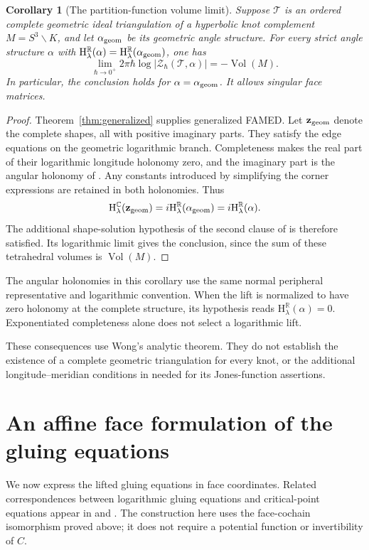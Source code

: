 \documentclass[11pt]{article}
\newtheorem{corollary}[theorem]{Corollary}
\theoremstyle{definition}\newtheorem{definition}[theorem]{Definition}
\theoremstyle{remark}\newtheorem{remark}[theorem]{Remark}
\newcommand{\R}{\mathbb R}
\begin{document}
\begin{corollary}[The partition-function volume limit]\label{cor:volumelimit}
Suppose $\mathcal T$ is an ordered complete geometric ideal
triangulation of a hyperbolic knot complement $M=S^3\smallsetminus K$,
and let $\alpha_{\rm geom}$ be its geometric angle structure.
For every strict angle structure $\alpha$ with
$\mathrm H_\lambda^{\R}(\alpha)=
\mathrm H_\lambda^{\R}(\alpha_{\rm geom})$, one has
\[
\lim_{\hbar\to0^+}2\pi\hbar
\log|\mathscr Z_\hbar(\mathcal T,\alpha)|=-\operatorname{Vol}(M).
\]
In particular, the conclusion holds for $\alpha=\alpha_{\rm geom}$.
It allows singular face matrices.
\end{corollary}
\begin{proof}
Theorem~\ref{thm:generalized} supplies generalized FAMED. Let
$\mathbf z_{\rm geom}$ denote the complete shapes, all with positive
imaginary parts. They satisfy the edge equations on the geometric
logarithmic branch. Completeness makes the real part of their
logarithmic longitude holonomy zero, and the imaginary part is the
angular holonomy of \cite[Section~2.2]{Wong}. Any constants introduced
by simplifying the corner expressions are retained in both holonomies. Thus
\[
\mathrm H_\lambda^{\mathbb C}(\mathbf z_{\rm geom})
=i\mathrm H_\lambda^{\R}(\alpha_{\rm geom})
=i\mathrm H_\lambda^{\R}(\alpha).
\]
The additional shape-solution hypothesis of the second clause of
\cite[Theorem~1.11]{Wong} is therefore satisfied. Its logarithmic
limit gives the conclusion, since the sum of these tetrahedral
volumes is $\operatorname{Vol}(M)$.
\end{proof}
The angular holonomies in this corollary use the same normal
peripheral representative and logarithmic convention. When the lift
is normalized to have zero holonomy at the complete structure, its
hypothesis reads $\mathrm H_\lambda^{\R}(\alpha)=0$. Exponentiated
completeness alone does not select a logarithmic lift.

These consequences use Wong's analytic theorem. They do not establish
the existence of a complete geometric triangulation for every knot,
or the additional longitude--meridian conditions in
\cite[Definition~1.5]{Wong} needed for its Jones-function assertions.

\section{An affine face formulation of the gluing equations}\label{sec:affine}
We now express the lifted gluing equations in face coordinates. Related correspondences between logarithmic gluing equations and critical-point equations appear in \cite[Proposition~3.4]{BW} and \cite[Lemma~3.6 and Proposition~3.9]{Wong}. The construction here uses the face-cochain isomorphism proved above; it does not require a potential function or invertibility of $C$.
\end{document}
